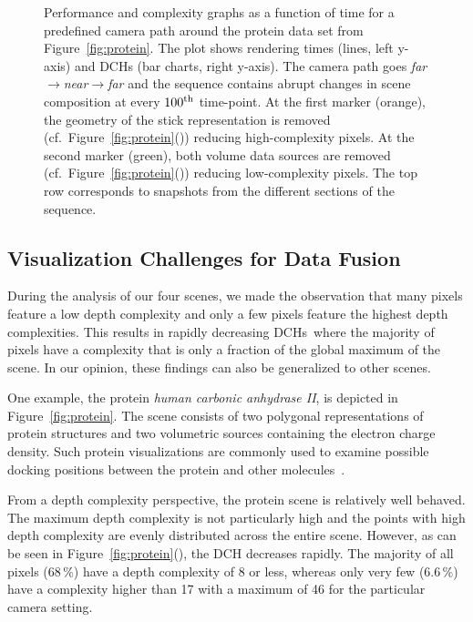 \documentclass{egpubl}
\newcommand{\dch}{DCH}
\newcommand{\dchs}{DCHs}
\begin{document}
\begin{figure}[t]
\begin{minipage}{1.0\linewidth}
  \end{minipage}
  \caption{\label{fig:viewdep}%
    Performance and complexity graphs as a function of time for a predefined camera path around the protein data set from Figure~\ref{fig:protein}. 
    The plot shows rendering times (lines, left y-axis) and \dch{}s (bar charts, right y-axis). 
    The camera path goes \emph{far}$\rightarrow$\emph{near}$\rightarrow$\emph{far} and the sequence contains abrupt changes in scene composition at every $100\textsuperscript{th}$ time-point. 
    At the first marker (orange), the geometry of the stick representation is removed (cf.~Figure~\ref{fig:protein}()) reducing high-complexity pixels. 
    At the second marker (green), both volume data sources are removed (cf.~Figure~\ref{fig:protein}()) reducing low-complexity pixels. 
    The top row corresponds to snapshots from the different sections of the sequence. 
  }
\end{figure}



\subsection{Visualization Challenges for Data Fusion}
\label{sec:vischallenges}

During the analysis of our four scenes, we made the observation that many pixels feature a low depth complexity and only a few pixels feature the highest depth complexities. 
This results in rapidly decreasing \dchs\ where the majority of pixels have a complexity that is only a fraction of the global maximum of the scene.
In our opinion, these findings can also be generalized to other scenes.

%
One example, the protein \emph{human carbonic anhydrase II}, is depicted in Figure~\ref{fig:protein}. 
The scene consists of two polygonal representations of protein structures and two volumetric sources containing the electron charge density. 
Such protein visualizations are commonly used to examine possible docking positions between the protein and other molecules~\cite{Seeliger2010}. 

From a depth complexity perspective, the protein scene is relatively well behaved.
The maximum depth complexity is not particularly high and the points with high depth complexity are evenly distributed across the entire scene. 
However, as can be seen in Figure~\ref{fig:protein}(), the \dch{} decreases rapidly. 
The majority of all pixels ($68\,\%$) have a depth complexity of 8 or less, whereas only very few ($6.6\,\%$) have a complexity higher than 17 with a maximum of 46 for the particular camera setting. 
\end{document}
